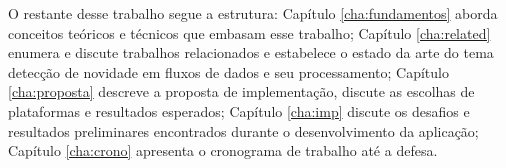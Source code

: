 

O restante desse trabalho segue a estrutura:
Capítulo \ref{cha:fundamentos} aborda conceitos teóricos e técnicos que embasam
esse trabalho;
Capítulo \ref{cha:related} enumera e discute trabalhos relacionados e estabelece
o estado da arte do tema detecção de novidade em fluxos de dados e seu processamento;
Capítulo \ref{cha:proposta} descreve a proposta de implementação, discute
as escolhas de plataformas e resultados esperados;
Capítulo \ref{cha:imp} discute os desafios e resultados preliminares encontrados
durante o desenvolvimento da aplicação;
Capítulo \ref{cha:crono} apresenta o cronograma de trabalho até a defesa.
